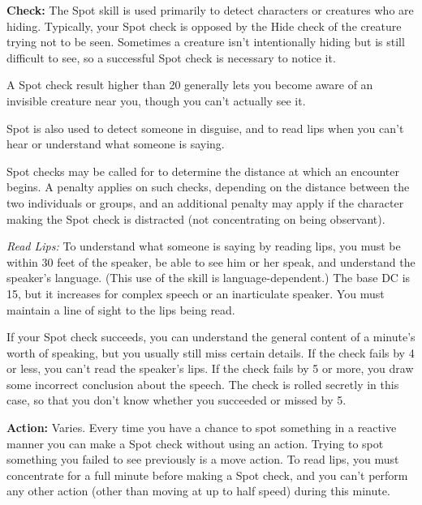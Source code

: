 \textbf{Check:} The Spot skill is used primarily to detect characters or creatures who are hiding. Typically, your Spot check is opposed by the Hide check of the creature trying not to be seen. Sometimes a creature isn’t intentionally hiding but is still difficult to see, so a successful Spot check is necessary to notice it.

A Spot check result higher than 20 generally lets you become aware of an invisible creature near you, though you can’t actually see it.

Spot is also used to detect someone in disguise, and to read lips when you can’t hear or understand what someone is saying.

Spot checks may be called for to determine the distance at which an encounter begins. A penalty applies on such checks, depending on the distance between the two individuals or groups, and an additional penalty may apply if the character making the Spot check is distracted (not concentrating on being observant).


\textit{Read Lips:} To understand what someone is saying by reading lips, you must be within 30 feet of the speaker, be able to see him or her speak, and understand the speaker’s language. (This use of the skill is language-dependent.) The base DC is 15, but it increases for complex speech or an inarticulate speaker. You must maintain a line of sight to the lips being read.

If your Spot check succeeds, you can understand the general content of a minute’s worth of speaking, but you usually still miss certain details. If the check fails by 4 or less, you can’t read the speaker’s lips. If the check fails by 5 or more, you draw some incorrect conclusion about the speech. The check is rolled secretly in this case, so that you don’t know whether you succeeded or missed by 5.

\textbf{Action:} Varies. Every time you have a chance to spot something in a reactive manner you can make a Spot check without using an action. Trying to spot something you failed to see previously is a move action. To read lips, you must concentrate for a full minute before making a Spot check, and you can’t perform any other action (other than moving at up to half speed) during this minute.

